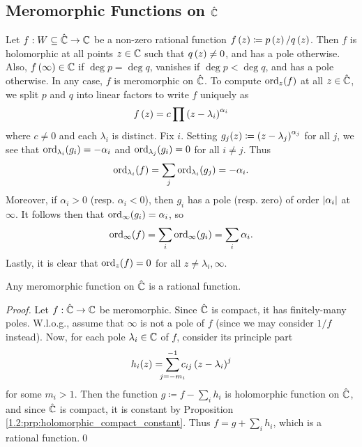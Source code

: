 \documentclass[../Moduli_Spaces_of_Riemann_Surfaces.tex]{subfiles}
\begin{document}
    \subsection{Meromorphic Functions on $\hat{\mathbb{C}}$}
    \begin{example}
        Let $f:W\subseteq\hat{\mathbb{C}}\to\mathbb{C}$ be a non-zero rational function $f\left(z\right)\coloneqq p\left(z\right)/q\left(z\right)$. Then $f$ is holomorphic at all points $z\in\mathbb{C}$ such that $q\left(z\right)\neq0$, and has a pole otherwise. Also, $f\left(\infty\right)\in\mathbb{C}$ if $\deg p=\deg q$, vanishes if $\deg p<\deg q$, and has a pole otherwise. In any case, $f$ is meromorphic on $\hat{\mathbb{C}}$. To compute $\operatorname{ord}_z\!\left(f\right)$ at all $z\in\hat{\mathbb{C}}$, we split $p$ and $q$ into linear factors to write $f$ uniquely as
        \begin{equation*}
            f\left(z\right)=c\prod\left(z-\lambda_i\right)^{\alpha_i}
        \end{equation*}
        where $c\neq0$ and each $\lambda_i$ is distinct. Fix $i$. Setting $g_j\!\left(z\right)\coloneqq\left(z-\lambda_j\right)^{\alpha_j}$ for all $j$, we see that $\operatorname{ord}_{\lambda_i}\!\left(g_i\right)=-\alpha_i$ and $\operatorname{ord}_{\lambda_j}\!\left(g_i\right)=0$ for all $i\neq j$. Thus
        \begin{equation*}
            \operatorname{ord}_{\lambda_i}\!\left(f\right)=\sum_j\operatorname{ord}_{\lambda_i}\!\left(g_j\right)=-\alpha_i.
        \end{equation*}
        Moreover, if $\alpha_i>0$ (resp. $\alpha_i<0$), then $g_i$ has a pole (resp. zero) of order $\left|\alpha_i\right|$ at $\infty$. It follows then that $\operatorname{ord}_\infty\!\left(g_i\right)=\alpha_i$, so
        \begin{equation*}
            \operatorname{ord}_\infty\!\left(f\right)=\sum_i\operatorname{ord}_\infty\!\left(g_i\right)=\sum_i\alpha_i.
        \end{equation*}
        Lastly, it is clear that $\operatorname{ord}_z\!\left(f\right)=0$ for all $z\neq \lambda_i,\infty$.\exqed
    \end{example}
    \begin{proposition}\label{1.2:prp:meromorphic_Riemann_sphere_rational}
        Any meromorphic function on $\hat{\mathbb{C}}$ is a rational function.
    \end{proposition}
    \begin{proof}
        Let $f:\hat{\mathbb{C}}\to\mathbb{C}$ be meromorphic. Since $\hat{\mathbb{C}}$ is compact, it has finitely-many poles. W.l.o.g., assume that $\infty$ is not a pole of $f$ (since we may consider $1/f$ instead). Now, for each pole $\lambda_i\in\mathbb{C}$ of $f$, consider its principle part
        \begin{equation*}
            h_i\!\l(z\r)=\sum_{\mathclap{j=-m_i}}^{-1}c_{ij}\l(z-\lambda_i\r)^j
        \end{equation*}
        for some $m_i>1$. Then the function $g\coloneqq f-\sum_ih_i$ is holomorphic function on $\hat{\mathbb{C}}$, and since $\hat{\mathbb{C}}$ is compact, it is constant by Proposition \ref{1.2:prp:holomorphic_compact_constant}. Thus $f=g+\sum_ih_i$, which is a rational function.\qed
    \end{proof}
\end{document}
